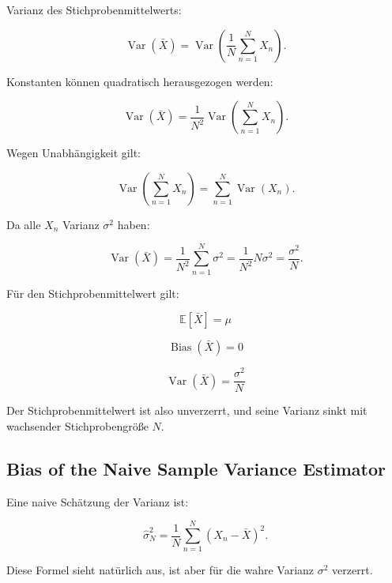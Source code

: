 \documentclass[11pt,a4paper]{scrartcl}
\begin{document}
\begin{calculationbox}
    Varianz des Stichprobenmittelwerts:

    \[
        \operatorname{Var}(\bar X)
        =
        \operatorname{Var}
        \left(
            \frac{1}{N}
            \sum_{n=1}^{N}X_n
        \right).
    \]

    Konstanten können quadratisch herausgezogen werden:

    \[
        \operatorname{Var}(\bar X)
        =
        \frac{1}{N^2}
        \operatorname{Var}
        \left(
            \sum_{n=1}^{N}X_n
        \right).
    \]

    Wegen Unabhängigkeit gilt:

    \[
        \operatorname{Var}
        \left(
            \sum_{n=1}^{N}X_n
        \right)
        =
        \sum_{n=1}^{N}\operatorname{Var}(X_n).
    \]

    Da alle \(X_n\) Varianz \(\sigma^2\) haben:

    \[
        \operatorname{Var}(\bar X)
        =
        \frac{1}{N^2}
        \sum_{n=1}^{N}
        \sigma^2
        =
        \frac{1}{N^2}N\sigma^2
        =
        \frac{\sigma^2}{N}.
    \]
\end{calculationbox}

\begin{answerbox}
    Für den Stichprobenmittelwert gilt:

    \[
        \boxed{
            \mathbb{E}[\bar X]=\mu
        }
    \]

    \[
        \boxed{
            \operatorname{Bias}(\bar X)=0
        }
    \]

    \[
        \boxed{
            \operatorname{Var}(\bar X)
            =
            \frac{\sigma^2}{N}
        }
    \]

    Der Stichprobenmittelwert ist also unverzerrt, und seine Varianz sinkt mit
    wachsender Stichprobengröße \(N\).
\end{answerbox}

\subsection{Bias of the Naive Sample Variance Estimator}

\begin{notebox}
    Eine naive Schätzung der Varianz ist:

    \[
        \hat\sigma_N^2
        =
        \frac{1}{N}
        \sum_{n=1}^{N}
        (X_n-\bar X)^2.
    \]

    Diese Formel sieht natürlich aus, ist aber für die wahre Varianz
    \(\sigma^2\) verzerrt.
\end{notebox}
\end{document}
